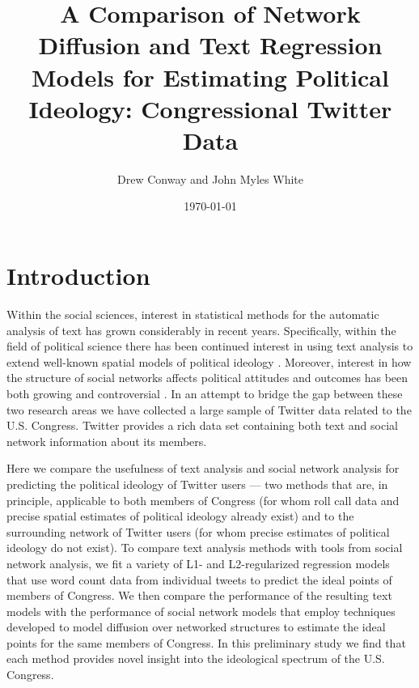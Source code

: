 \documentclass[10pt]{article}
\title{A Comparison of Network Diffusion and Text Regression Models for Estimating Political Ideology: Congressional Twitter Data}
\author{Drew Conway and John Myles White}
\date{\today}
\begin{document}
\maketitle

\section{Introduction}
Within the social sciences, interest in statistical methods for the automatic analysis of text has grown considerably in recent years.  Specifically, within the field of political science there has been continued interest in using text analysis to extend well-known spatial models of political ideology \citep{Grimmer_2011, Monroe_2008, Laver_2003}.  Moreover, interest in how the structure of social networks affects political attitudes and outcomes has been both growing \citep{Siegel_2009, Burton_2009} and controversial \citep{Fowler_2010, Lyons_2010}.  In an attempt to bridge the gap between these two research areas we have collected a large sample of Twitter data related to the U.S. Congress. Twitter provides a rich data set containing both text and social network information about its members. 

Here we compare the usefulness of text analysis and social network analysis for predicting the political ideology of Twitter users --- two methods that are, in principle, applicable to both members of Congress (for whom roll call data and precise spatial estimates of political ideology already exist) and to the surrounding network of Twitter users (for whom precise estimates of political ideology do not exist). To compare text analysis methods with tools from social network analysis, we fit a variety of L1- and L2-regularized regression models that use word count data from individual tweets to predict the ideal points of members of Congress. We then compare the performance of the resulting text models with the performance of social network models that employ techniques developed to model diffusion over networked structures to estimate the ideal points for the same members of Congress. In this preliminary study we find that each method provides novel insight into the ideological spectrum of the U.S. Congress.
\end{document}
